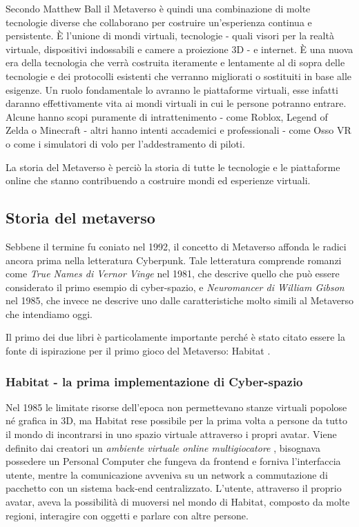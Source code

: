    Secondo Matthew Ball il Metaverso è quindi una combinazione di molte tecnologie diverse che collaborano per costruire un'esperienza continua e persistente.
    È l'unione di mondi virtuali, tecnologie - quali visori per la realtà virtuale, dispositivi indossabili e camere a proiezione 3D - e internet.
    È una nuova era della tecnologia che verrà costruita iteramente e lentamente al di sopra delle tecnologie e dei protocolli esistenti che verranno migliorati o sostituiti in base alle esigenze.
    Un ruolo fondamentale lo avranno le piattaforme virtuali, esse infatti daranno effettivamente vita ai mondi virtuali in cui le persone potranno entrare.
    Alcune hanno scopi puramente di intrattenimento - come Roblox, Legend of Zelda o Minecraft - altri hanno intenti accademici e professionali - come Osso VR o come i simulatori di volo per l'addestramento di piloti.

    La storia del Metaverso è perciò la storia di tutte le tecnologie e le piattaforme online che stanno contribuendo a costruire mondi ed esperienze virtuali.

    \subsection{Storia del metaverso}
    Sebbene il termine fu coniato nel 1992, il concetto di Metaverso affonda le radici ancora prima nella letteratura Cyberpunk.
    Tale letteratura comprende romanzi come \textit{True Names di Vernor Vinge} nel 1981, che descrive quello che può essere considerato il primo esempio di cyber-spazio, e \textit{Neuromancer di William Gibson} nel 1985, che invece ne descrive uno dalle caratteristiche molto simili al Metaverso che intendiamo oggi.

    Il primo dei due libri è particolamente importante perché è stato citato essere la fonte di ispirazione per il primo gioco del Metaverso: Habitat \cite{Habitat1990}.

        \subsubsection{Habitat - la prima implementazione di Cyber-spazio}        

        Nel 1985 le limitate risorse dell'epoca non permettevano stanze virtuali popolose né grafica in 3D, ma Habitat rese possibile per la prima volta a persone da tutto il mondo di incontrarsi in uno spazio virtuale attraverso i propri avatar. 
        Viene definito dai creatori un \textit{ambiente virtuale online multigiocatore} \cite{Habitat1990}, bisognava possedere un Personal Computer che fungeva da frontend e forniva l'interfaccia utente, mentre la comunicazione avveniva su un network a commutazione di pacchetto con un sistema back-end centralizzato.
        L'utente, attraverso il proprio avatar, aveva la possibilità di muoversi nel mondo di Habitat, composto da molte regioni, interagire con oggetti e parlare con altre persone.


